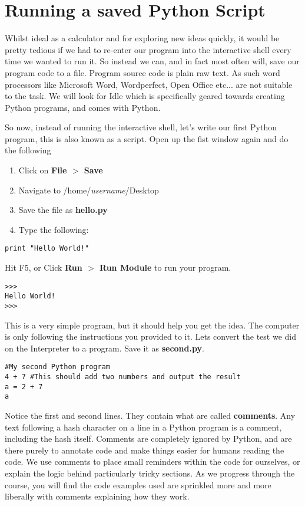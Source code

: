 \section{Running a saved Python Script}

Whilst ideal as a calculator and for exploring new ideas quickly, it   would be pretty tedious if we had to re-enter our program into the   interactive shell every time we wanted to run it. So instead we can,   and in fact most often will, save our program code to a file. Program   source code is plain raw text. As such word processors like Microsoft   Word, Wordperfect, Open Office etc... are not suitable to the task. We will   look for Idle which is specifically geared towards creating Python programs,   and comes with   Python. 

So now, instead of running the interactive shell, let's write our   first Python program, this is also known as a script. Open up the fist   window again and do the following
\begin{enumerate}
    \item Click on \textbf{File $>$ Save}
    \item Navigate to /home/\textit{username}/Desktop
    \item Save the file as \textbf{hello.py}
    \item Type the following:
\end{enumerate}
\begin{lstlisting}
print "Hello World!"
\end{lstlisting}

Hit F5, or Click \textbf{Run $>$ Run Module} to    run your program.


\begin{lstlisting}
>>>
Hello World!
>>>
\end{lstlisting}

This is a very simple program, but it should help you get the    idea. The computer is only following the instructions you provided   to it. Lets convert the test we did on the Interpreter to a program.   Save it as \textbf{second.py}.   
\begin{lstlisting}
#My second Python program
4 + 7 #This should add two numbers and output the result
a = 2 + 7
a
\end{lstlisting}

Notice the first and second lines. They contain what are called   \textbf{comments}. Any text following a hash character on a   line in a Python program is a comment, including the hash itself.   Comments are completely ignored by Python, and are there purely to   annotate code and make things easier for humans reading the code. We   use comments to place small reminders within the code for ourselves, or   explain the logic behind particularly tricky sections. As we   progress through the course, you will find the code examples used are   sprinkled more and more liberally with comments explaining how they   work.

